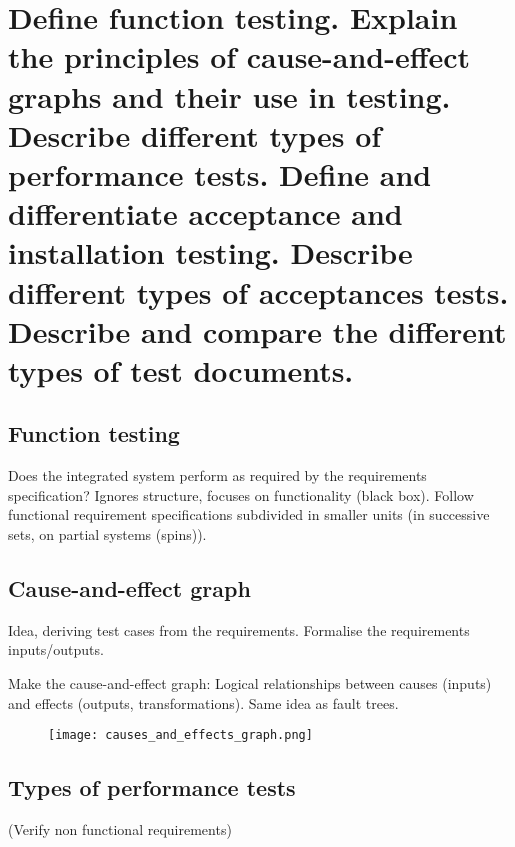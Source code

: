 \clearpage{}
\section{Define function testing. Explain the principles of cause-and-effect
graphs and their use in testing. Describe different types of performance
tests. Define and differentiate acceptance and installation testing.
Describe different types of acceptances tests. Describe and compare the
different types of test documents.}


\subsection{Function testing}
Does the integrated system perform as required by the requirements specification? \newline
Ignores structure, focuses on functionality (black box). \newline
Follow functional requirement specifications subdivided in smaller units (in successive sets,
on partial systems (spins)).

\subsection{Cause-and-effect graph}
Idea, deriving test cases from the requirements. Formalise the requirements inputs/outputs. \newline

Make the cause-and-effect graph: Logical relationships between causes (inputs) and effects (outputs, transformations). Same idea as fault trees.

\begin{figure}[!ht]
    \centering
    \texttt{[image: causes\_and\_effects\_graph.png]}
\end{figure}

\subsection{Types of performance tests}
(Verify non functional requirements)

